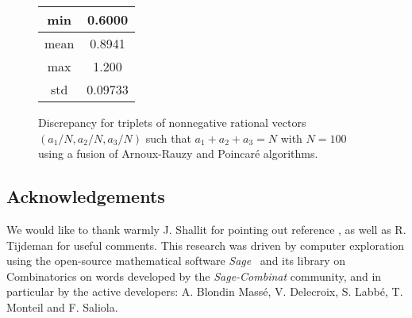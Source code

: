 \documentclass[preliminary,copyright,creativecommons]{eptcs}
\begin{document}
\begin{center}
\begin{figure}[ht!]
\begin{minipage}[c]{0.2\linewidth}
\begin{tabular}{c|c}
min & 0.6000 \\
\hline
mean & 0.8941 \\
\hline
max & 1.200 \\
\hline
std & 0.09733 \\
\end{tabular}
 \end{minipage}
\begin{minipage}[c]{0.8\linewidth}
\end{minipage}
 \caption{Discrepancy for triplets of nonnegative rational  vectors   $(a_1/N,a_2/N,a_3/N)$ such that $a_1+a_2+a_3=N$ with $N=100$ using a fusion of  Arnoux-Rauzy and Poincar\'e algorithms.}
\label{fig:PAR}
\end{figure}
\end{center}







\newpage
\subsection*{Acknowledgements}
We  would  like to thank  warmly J. Shallit for  pointing  out    reference \cite{tij}, as well as R. Tijdeman for useful comments.
This research was driven by computer exploration using the open-source
mathematical software \emph{Sage}~\cite{sage} and its library on Combinatorics on words developed by the \emph{Sage-Combinat}
community, and in particular by the active developers:  A. Blondin Mass\'e, V. Delecroix, S. Labb\'e, T. Monteil and  F. Saliola.

\nocite{*}


\end{document}
